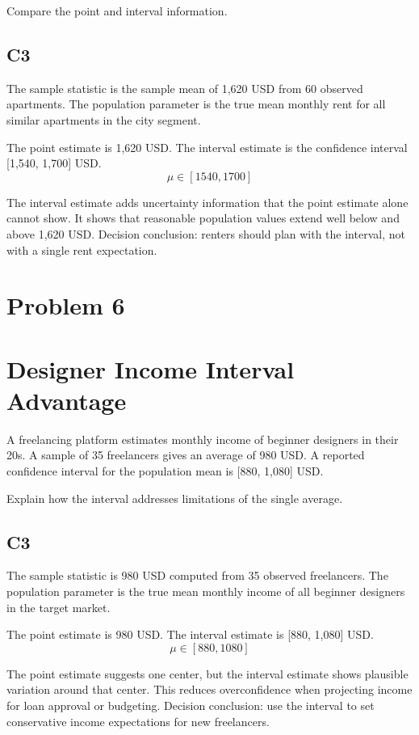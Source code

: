 \begin{ExamProblems}
		Compare the point and interval information.

		\subsection*{C3}
		The sample statistic is the sample mean of 1,620 USD from 60 observed apartments.
		The population parameter is the true mean monthly rent for all similar apartments in the city segment.

		The point estimate is 1,620 USD.
		The interval estimate is the confidence interval [1,540, 1,700] USD.
		\[
		\mu \in [1540,1700]
		\]

		The interval estimate adds uncertainty information that the point estimate alone cannot show.
		It shows that reasonable population values extend well below and above 1,620 USD.
		Decision conclusion: renters should plan with the interval, not with a single rent expectation.

		\newpage
		\item
		\section{Problem 6}
		\section{Designer Income Interval Advantage}
		A freelancing platform estimates monthly income of beginner designers in their 20s.
		A sample of 35 freelancers gives an average of 980 USD.
		A reported confidence interval for the population mean is [880, 1,080] USD.

		Explain how the interval addresses limitations of the single average.

		\subsection*{C3}
		The sample statistic is 980 USD computed from 35 observed freelancers.
		The population parameter is the true mean monthly income of all beginner designers in the target market.

		The point estimate is 980 USD.
		The interval estimate is [880, 1,080] USD.
		\[
		\mu \in [880,1080]
		\]

		The point estimate suggests one center, but the interval estimate shows plausible variation around that center.
		This reduces overconfidence when projecting income for loan approval or budgeting.
		Decision conclusion: use the interval to set conservative income expectations for new freelancers.


\end{ExamProblems}
